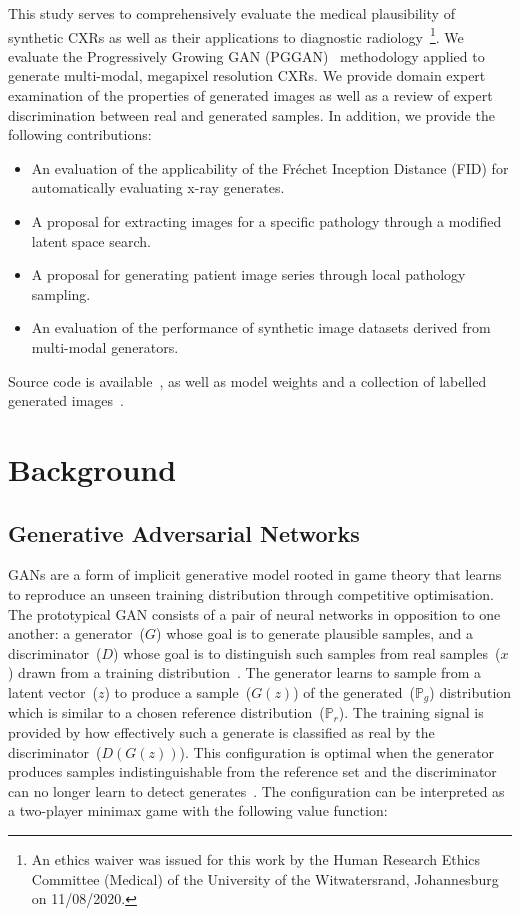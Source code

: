 \documentclass{article}
\begin{document}
This study serves to comprehensively evaluate the medical plausibility of synthetic CXRs as well as their applications to diagnostic radiology~\footnote{An ethics waiver was issued for this work by the Human Research Ethics Committee (Medical) of the University of the Witwatersrand, Johannesburg on 11/08/2020.}. We evaluate the Progressively Growing GAN (PGGAN)~\cite{karrasProgressiveGrowingGANs2018} methodology applied to generate multi-modal, megapixel resolution CXRs. We provide domain expert examination of the properties of generated images as well as a review of expert discrimination between real and generated samples. In addition, we provide the following contributions:
\begin{itemize}
\item An evaluation of the applicability of the Fréchet Inception Distance (FID) for automatically evaluating x-ray generates.
\item A proposal for extracting images for a specific pathology through a modified latent space search.
\item A proposal for generating patient image series through local pathology sampling.  
\item An evaluation of the performance of synthetic image datasets derived from multi-modal generators.
\end{itemize}

Source code is available~\cite{segal2021CXRPGGANCode}, as well as model weights and a collection of labelled generated images~\cite{segal2021CXRPGGANModel}.

\section{Background}

\subsection{Generative Adversarial Networks}
GANs are a form of implicit generative model rooted in game theory that learns to reproduce an unseen training distribution through competitive optimisation. The prototypical GAN consists of a pair of neural networks in opposition to one another: a generator~($G$) whose goal is to generate plausible samples, and a discriminator~($D$) whose goal is to distinguish such samples from real samples~($x$) drawn from a training distribution~\cite{goodfellowGenerativeAdversarialNetworks2014}. The generator learns to sample from a latent vector~($z$) to produce a sample~($G(z)$) of the generated~($\mathbb P_{g}$) distribution which is similar to a chosen reference distribution~($\mathbb P_{r}$). The training signal is provided by how effectively such a generate is classified as real by the discriminator~($D(G(z))$). This configuration is optimal when the generator produces samples indistinguishable from the reference set and the discriminator can no longer learn to detect generates~\cite{meschederWhichTrainingMethods2018,salimansImprovedTechniquesTraining2016}. The configuration can be interpreted as a two-player minimax game with the following value function:
\end{document}
